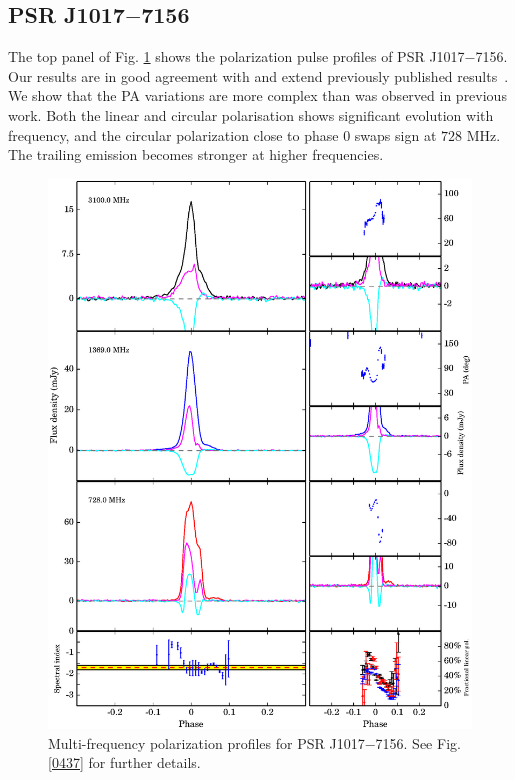\documentclass[useAMS,usenatbib]{mn2e}
\begin{document}
%
%

\subsection{PSR J1017$-$7156}

The top panel of Fig. \ref{1017} shows the polarization pulse profiles of 
PSR J1017$-$7156.
%
Our results are in good agreement with and extend previously published 
results~\citep{Keith12}. 
%
We show that the PA variations are more complex than was observed in 
previous work.
%
%
Both the linear and circular polarisation shows significant evolution 
with frequency, and the circular polarization close to phase $0$ swaps sign 
at $728$ MHz. 
%
The trailing emission becomes stronger at higher frequencies.



\begin{figure}
\begin{center}
\includegraphics[width=6 in]{1017.ps}
\caption{Multi-frequency polarization profiles for PSR J1017$-$7156. 
See Fig. \ref{0437} for further details.}
\label{1017}
\end{center}
\end{figure}
\end{document}
